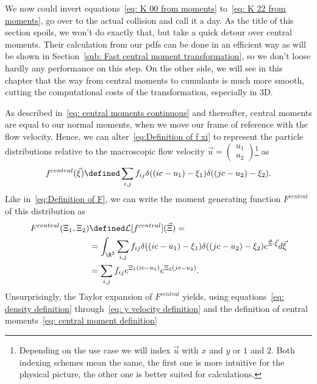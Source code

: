 We now could invert equations~\eqref{eq: K 00 from moments} to~\eqref{eq: K 22 from moments}, go over to the actual collision and call it a day.
As the title of this section spoils, we won't do exactly that, but take a quick detour over central moments.
Their calculation from our \glspl{pdf} can be done in an efficient way as will be shown in Section~\ref{sub: Fast central moment transformation},
so we don't loose hardly any performance on this step.
On the other side, we will see in this chapter that the way from central moments to cumulants is much more smooth, cutting the computational costs of the transformation, especially in 3D.

As described in~\eqref{eq: central moments continuous} and thereafter, central moments are equal to our normal moments, when we move our frame of reference with the flow velocity.
Hence, we can alter~\eqref{eq:Definition of f xi} to represent the particle distributions relative to the macroscopic flow velocity $\vec{u}=\begin{pmatrix}u_1\\u_2\end{pmatrix}$\footnote{Depending on the use case we will index $\vec{u}$ with $x$ and $y$ or $1$ and $2$.
Both indexing schemes mean the same, the first one is more intuitive for the physical picture, the other one is better suited for calculations.} as
\begin{equation*}
  f^{central}(\vec{\xi}) \defined \sum_{i,j} f_{ij}\delta((ic - u_1) - \xi_1)\delta((jc - u_2) -\xi_2) .
\end{equation*}
Like in~\eqref{eq:Definition of F}, we can write the moment generating function $F^{central}$ of this distribution as
\begin{equation}
  \label{eq: Definition of centralized F}
  \begin{aligned}
    F^{central}(\Xi_1, \Xi_2) & \defined \mathcal{L}[f^{central}](\vec{\Xi}) =  \\
    & = \int_{\R^2} \sum_{i,j} f_{ij}\delta((ic - u_1) - \xi_1)\delta((jc - u_2) -\xi_2) e^{\vec{\Xi} \cdot \vec{\xi}}d\vec{\xi} \\
    & =\sum_{i,j} f_{ij} e^{\Xi_1(ic - u_1)} e^{\Xi_2(jc - u_2)}.
  \end{aligned}
\end{equation}
Unsurprisingly, the Taylor expansion of $F^{central}$ yields, using equations~\eqref{eq: density definition} through~\eqref{eq: y velocity definition} and the definition of central moments~\eqref{eq: central moment definition}
